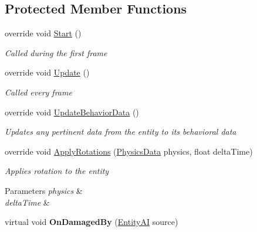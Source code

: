 \subsection*{Protected Member Functions}
\begin{DoxyCompactItemize}
\item 
\hypertarget{class_skyrates_1_1_entity_1_1_entity_ship_ac2b8dda2c943aafd80ff399e35a2abe9}{override void \hyperlink{class_skyrates_1_1_entity_1_1_entity_ship_ac2b8dda2c943aafd80ff399e35a2abe9}{Start} ()}\label{class_skyrates_1_1_entity_1_1_entity_ship_ac2b8dda2c943aafd80ff399e35a2abe9}

\begin{DoxyCompactList}\small\item\em Called during the first frame  \end{DoxyCompactList}\item 
\hypertarget{class_skyrates_1_1_entity_1_1_entity_ship_a7a98596188c19f1f509d2bbcec0328e1}{override void \hyperlink{class_skyrates_1_1_entity_1_1_entity_ship_a7a98596188c19f1f509d2bbcec0328e1}{Update} ()}\label{class_skyrates_1_1_entity_1_1_entity_ship_a7a98596188c19f1f509d2bbcec0328e1}

\begin{DoxyCompactList}\small\item\em Called every frame  \end{DoxyCompactList}\item 
override void \hyperlink{class_skyrates_1_1_entity_1_1_entity_ship_ad53902e9ca6a6967d4397282393cdc74}{Update\-Behavior\-Data} ()
\begin{DoxyCompactList}\small\item\em Updates any pertinent data from the entity to its behavioral data \end{DoxyCompactList}\item 
\hypertarget{class_skyrates_1_1_entity_1_1_entity_ship_a9cff63dfc4ee894106a1ee81d4a4e40a}{override void \hyperlink{class_skyrates_1_1_entity_1_1_entity_ship_a9cff63dfc4ee894106a1ee81d4a4e40a}{Apply\-Rotations} (\hyperlink{class_skyrates_1_1_physics_1_1_physics_data}{Physics\-Data} physics, float delta\-Time)}\label{class_skyrates_1_1_entity_1_1_entity_ship_a9cff63dfc4ee894106a1ee81d4a4e40a}

\begin{DoxyCompactList}\small\item\em Applies rotation to the entity 


\begin{DoxyParams}{Parameters}
{\em physics} & \\
\hline
{\em delta\-Time} & \\
\hline
\end{DoxyParams}
 \end{DoxyCompactList}\item 
\hypertarget{class_skyrates_1_1_entity_1_1_entity_ship_a7dbf7fa59ead3f606b9745cf1492bc8d}{virtual void {\bfseries On\-Damaged\-By} (\hyperlink{class_skyrates_1_1_entity_1_1_entity_a_i}{Entity\-A\-I} source)}\label{class_skyrates_1_1_entity_1_1_entity_ship_a7dbf7fa59ead3f606b9745cf1492bc8d}


\end{DoxyCompactItemize}
